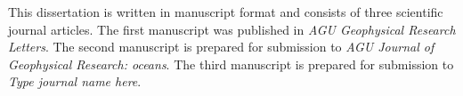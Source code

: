 %
This dissertation is written in manuscript format and consists of three scientific journal articles. The first manuscript was published in \textit{AGU Geophysical Research Letters}. The second manuscript is prepared for submission to \textit{AGU Journal of Geophysical Research: oceans}. The third manuscript is prepared for submission to \textit{Type journal name here}.

